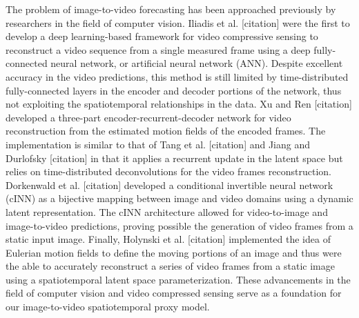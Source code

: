 \documentclass[default,iicol,lineno]{sn-jnl}%
\begin{document}
The problem of image-to-video forecasting has been approached previously by researchers in the field of computer vision. Iliadis et al. [citation] were the first to develop a deep learning-based framework for video compressive sensing to reconstruct a video sequence from a single measured frame using a deep fully-connected neural network, or artificial neural network (ANN). Despite excellent accuracy in the video predictions, this method is still limited by time-distributed fully-connected layers in the encoder and decoder portions of the network, thus not exploiting the spatiotemporal relationships in the data. Xu and Ren [citation] developed a three-part encoder-recurrent-decoder network for video reconstruction from the estimated motion fields of the encoded frames. The implementation is similar to that of Tang et al. [citation] and Jiang and Durlofsky [citation] in that it applies a recurrent update in the latent space but relies on time-distributed deconvolutions for the video frames reconstruction. Dorkenwald et al. [citation] developed a conditional invertible neural network (cINN) as a bijective mapping between image and video domains using a dynamic latent representation. The cINN architecture allowed for video-to-image and image-to-video predictions, proving possible the generation of video frames from a static input image. Finally, Holynski et al. [citation] implemented the idea of Eulerian motion fields to define the moving portions of an image and thus were the able to accurately reconstruct a series of video frames from a static image using a spatiotemporal latent space parameterization. These advancements in the field of computer vision and video compressed sensing serve as a foundation for our image-to-video spatiotemporal proxy model.
\end{document}
